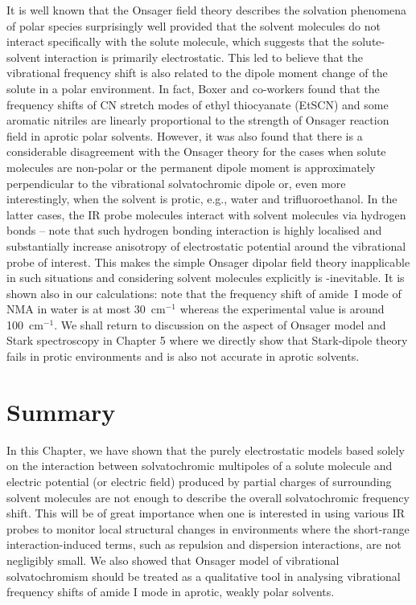 \documentclass[b5paper,oneside,fleqn,11pt]{book}
\begin{document}
\begin{refsection}
It is well known that the Onsager field theory describes
the solvation phenomena of polar species surprisingly
well provided that the solvent molecules do not interact
specifically with the solute molecule, which suggests that the
solute\hyp{}solvent interaction is primarily electrostatic. This led
to believe that the vibrational frequency shift is also related
to the dipole moment change of the solute in a polar
environment. In fact, Boxer and co\hyp{}workers found that the
frequency shifts of CN stretch modes of ethyl thiocyanate
(EtSCN) \citep{Fafarman.Sigala.Herschlag.Boxer.JACS.2010} 
and some aromatic nitriles \citep{Levinson.Fried.Boxer.JPCB.2012} 
are linearly proportional
to the strength of Onsager reaction field in aprotic polar
solvents. However, it was also found that there is a considerable
disagreement with the Onsager theory for the cases
when solute molecules are non-polar or the permanent dipole
moment is approximately perpendicular to the vibrational
solvatochromic dipole \citep{Levinson.Fried.Boxer.JPCB.2012} 
or, even more interestingly, when
the solvent is protic, e.g., water and 
trifluoroethanol. \citep{Fafarman.Sigala.Herschlag.Boxer.JACS.2010}  
In the latter cases, the IR probe molecules interact with solvent
molecules via hydrogen bonds -- note that such hydrogen bonding
interaction is highly localised and substantially
increase anisotropy of electrostatic potential around the vibrational
probe of interest. This makes the simple Onsager
dipolar field theory inapplicable in such situations and considering
solvent molecules explicitly is \hyp{inevitable}. It is shown also in our 
calculations: note that the frequency shift of amide~I mode of NMA in water
is at most 30~cm$^{-1}$ whereas the experimental value
is around 100~cm$^{-1}$. We shall return to discussion
on the aspect of Onsager model and Stark spectroscopy in Chapter 5 
where we directly show that Stark\hyp{}dipole
theory fails in protic environments and is also not accurate in aprotic solvents.

\section{Summary}

In this Chapter, we have shown that the purely electrostatic
models based solely on the interaction between
solvatochromic multipoles of a solute molecule and electric
potential (or electric field) produced by partial charges of
surrounding solvent molecules are not enough to describe the
overall solvatochromic frequency shift. This will be of great
importance when one is interested in using various IR probes
to monitor local structural changes in environments where the
short\hyp{}range interaction\hyp{}induced terms, such as repulsion and
dispersion interactions, are not negligibly small.
We also showed that Onsager model of vibrational solvatochromism
should be treated as a qualitative tool in analysing vibrational
frequency shifts of amide I mode in aprotic, weakly polar solvents.

\printbibliography[heading=subbibintoc,title={References}]
\end{refsection}
\end{document}
